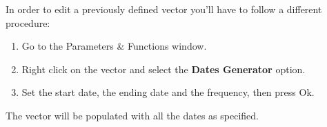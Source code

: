 

In order to edit a previously defined  vector  you'll have to follow a different procedure:
\begin{enumerate}
\item Go to the Parameters \& Functions window.
\item Right click on the vector and select the \textbf{Dates Generator} option.
\item Set the start date, the ending date and the frequency, then press Ok.
\end{enumerate}
The vector will be populated with all the dates as specified.

